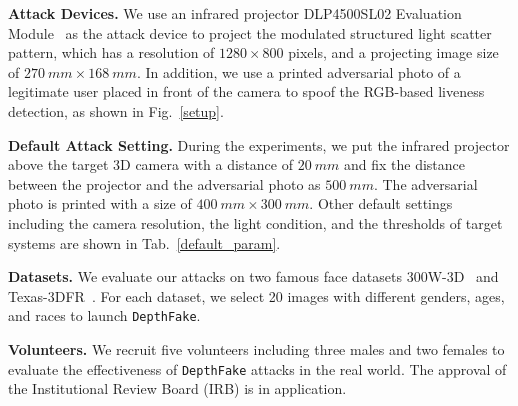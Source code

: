 \textbf{Attack Devices.} We use an infrared projector DLP4500SL02 Evaluation Module~\cite{chong2017intraoperative} as the attack device to project the modulated structured light scatter pattern, which has a resolution of $1280 \times 800$ pixels, and a projecting image size of $270~mm \times 168~mm$.
In addition, we use a printed adversarial photo of a legitimate user placed in front of the camera to spoof the RGB-based liveness detection, as shown in Fig.~\ref{setup}.

\textbf{Default Attack Setting.} During the experiments, we put the infrared projector above the target 3D camera with a distance of $20~mm$ and fix the distance between the projector and the adversarial photo as $500~mm$.
The adversarial photo is printed with a  size of $400~mm \times 300~mm$.
Other default settings including the camera resolution, the light condition, and the thresholds of target systems are shown in Tab.~\ref{default_param}.


\textbf{Datasets.} We evaluate our attacks on two famous face datasets  300W-3D~\cite{zhu2016face} and Texas-3DFR~\cite{gupta2010anthropometric, gupta2010texas}. 
For each dataset, we select 20 images with different genders, ages, and races to launch \texttt{DepthFake}.


\textbf{Volunteers.} We recruit five volunteers including three males and two females to evaluate the effectiveness of \texttt{DepthFake} attacks in the real world. The approval of the Institutional Review Board (IRB) is in application.


